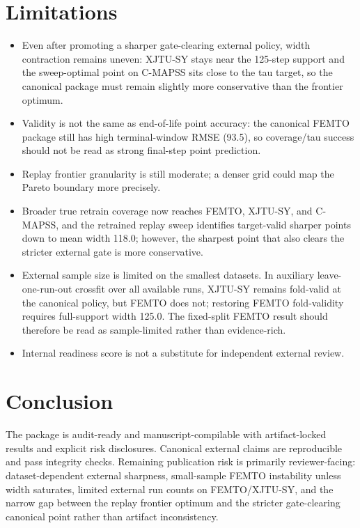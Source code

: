 \documentclass[11pt]{article}
\begin{document}
\section{Limitations}
\begin{itemize}[leftmargin=1.3em]
\item Even after promoting a sharper gate-clearing external policy, width contraction remains uneven: XJTU-SY stays near the \num{125}-step support and the sweep-optimal point on C-MAPSS sits close to the tau target, so the canonical package must remain slightly more conservative than the frontier optimum.
\item Validity is not the same as end-of-life point accuracy: the canonical FEMTO package still has high terminal-window RMSE (\num{93.5}), so coverage/tau success should not be read as strong final-step point prediction.
\item Replay frontier granularity is still moderate; a denser grid could map the Pareto boundary more precisely.
\item Broader true retrain coverage now reaches FEMTO, XJTU-SY, and C-MAPSS, and the retrained replay sweep identifies target-valid sharper points down to mean width \num{118.0}; however, the sharpest point that also clears the stricter external gate is more conservative.
\item External sample size is limited on the smallest datasets. In auxiliary leave-one-run-out crossfit over all available runs, XJTU-SY remains fold-valid at the canonical policy, but FEMTO does not; restoring FEMTO fold-validity requires full-support width \num{125.0}. The fixed-split FEMTO result should therefore be read as sample-limited rather than evidence-rich.
\item Internal readiness score is not a substitute for independent external review.
\end{itemize}

\section{Conclusion}
The package is audit-ready and manuscript-compilable with artifact-locked results and explicit risk disclosures. Canonical external claims are reproducible and pass integrity checks. Remaining publication risk is primarily reviewer-facing: dataset-dependent external sharpness, small-sample FEMTO instability unless width saturates, limited external run counts on FEMTO/XJTU-SY, and the narrow gap between the replay frontier optimum and the stricter gate-clearing canonical point rather than artifact inconsistency.



\end{document}
